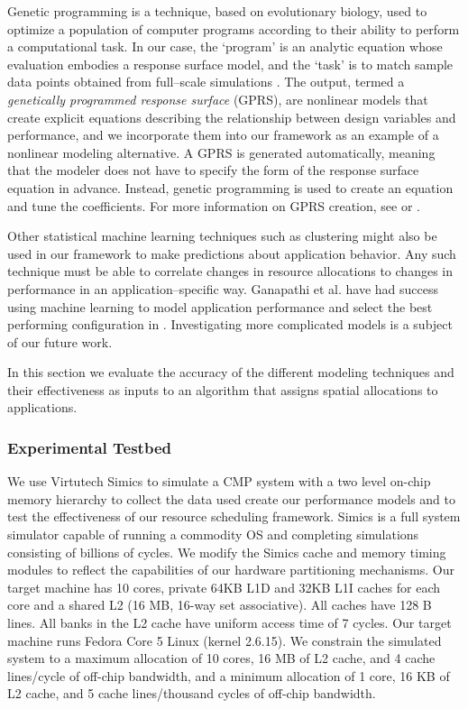 Genetic programming is a technique, based on evolutionary biology, used to optimize a population of computer programs according to their ability to perform a computational task. In our case, the `program' is an analytic equation whose evaluation embodies a response surface model, and the `task' is to match sample data points obtained from full--scale simulations \cite{alvarez-thesis}. The output, termed a
{\em genetically programmed response surface} (GPRS), are nonlinear models that create explicit equations describing the relationship between design variables and performance, and we incorporate them into our framework as an example of a nonlinear modeling alternative.
A GPRS is generated automatically, meaning that the modeler does not have to specify the form of the response surface equation in advance. Instead, genetic programming \cite{koza} is used to create an equation and tune the coefficients.  For more information on GPRS creation, see \cite{alvarez-thesis} or \cite{cook-dac08}.

Other statistical machine learning techniques such as clustering might also be used in our framework to make predictions about application behavior.  Any such technique must be able to correlate changes in resource allocations to changes in performance in an application--specific way.  Ganapathi et al. have had success using machine learning to model application performance and select the best performing configuration in \cite{Archana}. Investigating more complicated models is a subject of our future work.


In this section we evaluate the accuracy of the different modeling techniques and their effectiveness as inputs to an algorithm that assigns spatial allocations to applications.

\subsubsection*{Experimental Testbed}
We use Virtutech Simics \cite{simics} to simulate a CMP system with a two level on-chip memory hierarchy to collect the data used create our performance models and to test the effectiveness of our resource scheduling framework.  Simics is a full system simulator capable of running a commodity OS and completing simulations consisting of billions of cycles. We modify the Simics cache and memory timing modules to reflect the capabilities of our hardware partitioning mechanisms.  Our target machine has 10 cores, private 64KB L1D and 32KB L1I caches for each core and a shared L2 (16 MB, 16-way set associative).  All caches have 128 B lines.   All banks in the L2 cache have uniform access time of 7 cycles.  Our target machine runs Fedora Core 5 Linux (kernel 2.6.15). We constrain the simulated system to a maximum allocation of 10 cores, 16 MB of L2 cache, and 4 cache lines/cycle of off-chip bandwidth, and a minimum allocation of 1 core, 16 KB of L2 cache, and 5 cache lines/thousand cycles of off-chip bandwidth.

